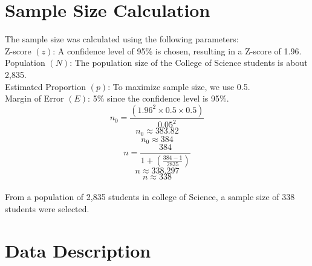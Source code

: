 \documentclass[doublespacing,12pt]{report}
\begin{document}
\section{Sample Size Calculation}
The sample size was calculated using the following parameters:
\vspace{0.3in}
\\
\vspace{0.1in}
{Z-score} \((z)\): A confidence level of 95\% is chosen, resulting in a Z-score of 1.96.\\
\vspace{0.1in}
{Population} \((N)\): The population size of the College of Science students is about 2,835.\\
\vspace{0.1in}
{Estimated Proportion} \((p)\): To maximize sample size, we use 0.5.\\
\vspace{0.1in}
{Margin of Error} \((E)\): 5\% since the confidence level is 95\%.\\


\begin{equation}
n_0 = \frac{\left(1.96^2 \times 0.5 \times 0.5\right)}{0.05^2}
\end{equation}
\begin{equation}
n_0 \approx 383.82
\end{equation}
\begin{equation}
n_0 \approx 384
\end{equation}
\begin{equation}
n = \frac{384}{1 + \left(\frac{384 - 1}{2835}\right)}
\end{equation}
\begin{equation}
n \approx 338.297
\end{equation}
\begin{equation}
n \approx 338
\end{equation}\\

\noindent From a population of 2,835 students in college of Science, a sample size of 338 students were selected.

\section{Data Description}
\end{document}

